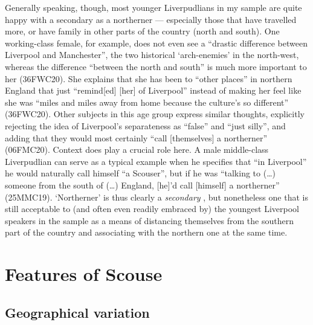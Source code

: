 Generally speaking, though, most younger Liverpudlians in my sample are quite happy with a secondary  as a northerner --- especially those that have travelled more, or have family in other parts of the country (north and south).
One working-class female, for example, does not even see a ``drastic difference between Liverpool and Manchester'', the two historical `arch-enemies' in the north-west, whereas the difference ``between the north and south'' is much more important to her (36FWC20).
She explains that she has been to ``other places'' in northern England that just ``remind[ed] [her] of Liverpool'' instead of making her feel like she was ``miles and miles away from home because the culture's so different'' (36FWC20).
Other subjects in this age group express similar thoughts, explicitly rejecting the idea of Liverpool's separateness as ``false'' and ``just silly'', and adding that they would most certainly ``call [themselves] a northerner'' (06FMC20).
Context does play a crucial role here.
A male middle-class Liverpudlian can serve as a typical example when he specifies that ``in Liverpool'' he would naturally call himself ``a Scouser'', but if he was ``talking to (\ldots) someone from the south of (\ldots) England, [he]'d call [himself] a northerner'' (25MMC19).
`Northerner' is thus clearly a \emph{secondary} , but nonetheless one that is still acceptable to (and often even readily embraced by) the youngest Liverpool speakers in the sample as a means of distancing themselves from the southern part of the country and associating with the northern one at the same time.

\section{Features of Scouse}

\subsection{Geographical variation}


